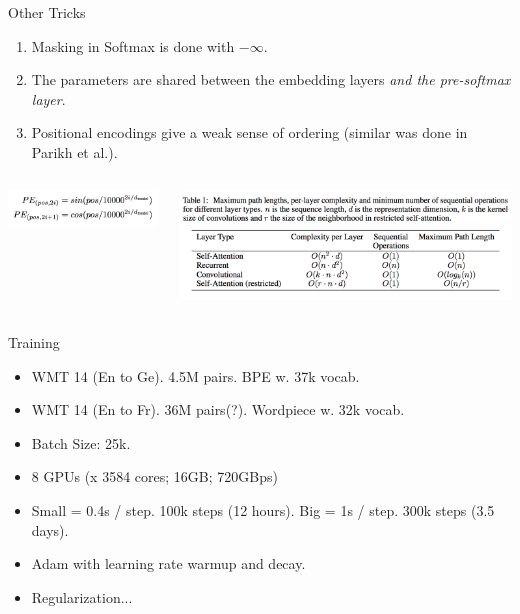 \documentclass{beamer}
\begin{document}
\begin{frame}{Other Tricks}{}
\begin{enumerate}
\item Masking in Softmax is done with $-\infty$.
\item The parameters are shared between the embedding layers \textit{and the pre-softmax layer}.
\item Positional encodings give a weak sense of ordering (similar was done in Parikh et al.).
\end{enumerate}

\begin{columns}[T] %
\begin{column}{.38\textwidth}
\begin{minipage}[c][.4\textheight][c]{\linewidth}
\includegraphics[width=\textwidth]{img/pos_emb.png}
\end{minipage}
\end{column}%
\hfill%
\begin{column}{.58\textwidth}
\begin{minipage}[c][.4\textheight][c]{\linewidth}
\includegraphics[width=\textwidth]{img/path_length.png}
\end{minipage}
\end{column}%
\end{columns}

\end{frame}
%

\begin{frame}{Training}{}
\begin{itemize}
\item WMT 14 (En to Ge). 4.5M pairs. BPE w. 37k vocab.
\item WMT 14 (En to Fr). 36M pairs(?). Wordpiece w. 32k vocab. 
\item Batch Size: 25k.
\item 8 GPUs (x 3584 cores; 16GB; 720GBps)
\item Small = 0.4s / step. 100k steps (12 hours). Big = 1s / step. 300k steps (3.5 days).
\item Adam with learning rate warmup and decay.
\item Regularization...

\end{itemize}
\end{frame}
%
\end{document}
